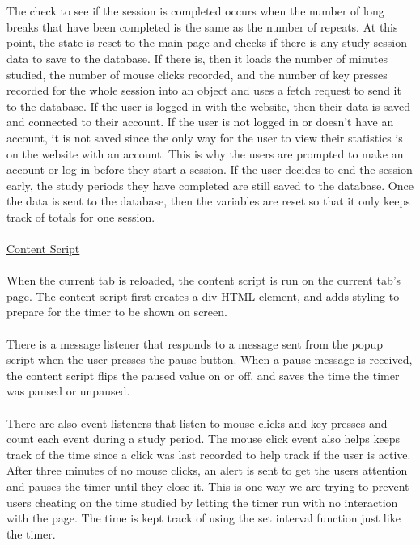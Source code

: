 \documentclass[12pt]{article}
\begin{document}
\\\\The check to see if the session is completed occurs when the number of long breaks that have been completed is the same as the number of repeats. 
At this point, the state is reset to the main page and checks if there is any study session data to save to the database. If there is, then it loads the number of minutes studied, 
the number of mouse clicks recorded, and the number of key presses recorded for the whole session into an object and uses a fetch request to send it to the database. If the user is logged in with 
the website, then their data is saved and connected to their account. If the user is not logged in or doesn't have an account, it is not saved since the only way for the user to view their statistics 
is on the website with an account. This is why the users are prompted to make an account or log in before they start a session. 
If the user decides to end the session early, the study periods they have completed are still saved to the database.
Once the data is sent to the database, then the variables are reset so that it only keeps track of totals for one session.
\\\\
\noindent
\underline{Content Script}\\\\
\indent When the current tab is reloaded, the content script is run on the current tab's page. The content script first creates a div HTML element, and adds styling to prepare
for the timer to be shown on screen. \\\\
\indent There is a message listener that responds to a message sent from the popup script
when the user presses the pause button. When a pause message is received, the content script flips the paused value on or off, and saves the time the timer was paused or unpaused.\\\\
\indent There are also event listeners that listen to mouse clicks and key presses and count each event during a study period. The mouse click event also helps keeps track of the time since a click 
was last recorded to help track if the user is active. After three minutes of no mouse clicks, an alert is sent to get the users attention and pauses the timer until they close it. This is one way we 
are trying to prevent users cheating on the time studied by letting the timer run with no interaction with the page. The time is kept track of using the set interval function just like the timer. \\
\end{document}
